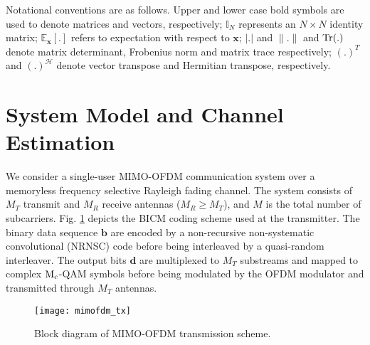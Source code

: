 \documentclass{article}
\def\eye{{\mathbb I}}
\begin{document}
Notational conventions are as follows. Upper and lower case bold symbols are used to denote matrices and vectors, respectively; $\eye_N$ represents an $N \times N$ identity matrix; $\mathbb{E}_{\mathbf{x}}[.]$ refers to expectation
with respect to $\mathbf{x}$; $|.|$ and $\|.\|$ and ${\rm Tr}(.)$ denote matrix determinant, Frobenius norm and matrix trace respectively; $(.)^T$ and $(.)^{\mathcal{H}}$ denote vector transpose and Hermitian transpose, respectively.
\vspace{-3mm}
\section{System Model and Channel Estimation}
\label{sec:model}
We consider a single-user MIMO-OFDM communication system over a memoryless frequency selective Rayleigh fading channel. The system consists of $M_T$ transmit and $M_R$ receive antennas ($M_R \geq M_T$), and $M$ is the total number of subcarriers. Fig. \ref{mimofdm_tx} depicts the BICM coding scheme used at the transmitter. The binary data sequence ${\bm b}$ are encoded by a non-recursive non-systematic convolutional (NRNSC) code before being interleaved by a quasi-random interleaver. The output bits ${\bm d}$ are multiplexed to $M_T$ substreams and mapped to complex ${\rm M_c}$-QAM symbols before being modulated by the OFDM modulator and transmitted through $M_T$ antennas.
\begin{figure}[!t]
\centering
\texttt{[image: mimofdm\_tx]}
\caption{Block diagram of MIMO-OFDM transmission scheme.}\label{mimofdm_tx}
\end{figure}
\end{document}
